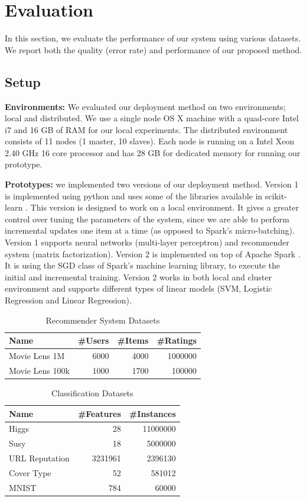 \documentclass{vldb}
\begin{document}
\section{Evaluation} \label{evaluation} 
In this section, we evaluate the performance of our system using various datasets. 
We report both the quality (error rate) and performance of our proposed method. 

\subsection{Setup}
\textbf{Environments:} We evaluated our deployment method on two environments; local and distributed.
We use a single node OS X machine with  a quad-core Intel i7 and 16 GB of RAM for our local experiments.
The distributed environment consists of 11 nodes (1 master, 10 slaves).
Each node is running on a Intel Xeon 2.40 GHz 16 core processor and has 28 GB for dedicated memory for running our prototype.

\textbf{Prototypes:} we implemented two versions of our deployment method.
Version 1 is implemented using python and uses some of the libraries available in scikit-learn \cite{sklearn_api}.
This version is designed to work on a local environment.
It gives a greater control over tuning the parameters of the system, since we are able to perform incremental updates one item at a time (as opposed to Spark's micro-batching).
Version 1 supports neural networks (multi-layer perceptron) and recommender system (matrix factorization).
Version 2 is implemented on top of Apache Spark \cite{zaharia2010spark}.
It is using the SGD class of Spark's machine learning library, to execute the initial and incremental training.
Version 2 works in both local and cluster environment and supports different types of linear models (SVM, Logistic Regression and Linear Regression).

\begin{table}\centering
\begin{tabular}{lrrr}
 \toprule
Name & \#Users & \#Items & \#Ratings
\\\midrule 
Movie Lens 1M  & 6000 & 4000 & 1000000 \\
Movie Lens 100k & 1000 & 1700 & 100000 
\\\bottomrule 
\end{tabular}
\caption{Recommender System Datasets}
\label{table:recommender-systems}
\end{table}

\begin{table}\centering
\begin{tabular}{lrr}
 \toprule
Name & \#Features  & \#Instances 
\\\midrule 
Higgs  & 28 & 11000000 \\
Susy & 18 & 5000000 \\ 
URL Reputation & 3231961 & 2396130 \\
Cover Type & 52 & 581012 \\
MNIST \cite{lecun-mnist} & 784 & 60000 
\\\bottomrule 
\end{tabular}
\caption{Classification Datasets}
\end{table}
\end{document}
